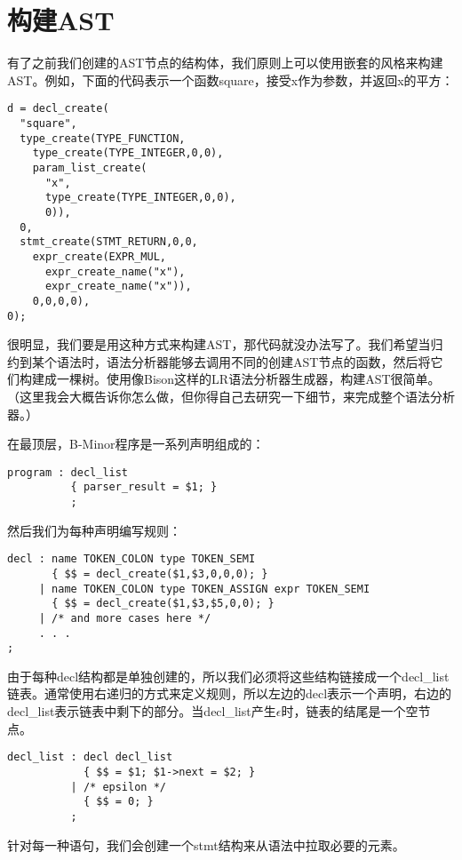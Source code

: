 \documentclass[cn,11pt,chinese]{elegantbook}
\begin{document}
\section{构建AST}

有了之前我们创建的AST节点的结构体，我们原则上可以使用嵌套的风格来构建AST。例如，下面的代码表示一个函数square，接受x作为参数，并返回x的平方：

\begin{verbatim}
d = decl_create(
  "square",
  type_create(TYPE_FUNCTION,
    type_create(TYPE_INTEGER,0,0),
    param_list_create(
      "x",
      type_create(TYPE_INTEGER,0,0),
      0)),
  0,
  stmt_create(STMT_RETURN,0,0,
    expr_create(EXPR_MUL,
      expr_create_name("x"),
      expr_create_name("x")),
    0,0,0,0),
0);
\end{verbatim}

很明显，我们要是用这种方式来构建AST，那代码就没办法写了。我们希望当归约到某个语法时，语法分析器能够去调用不同的创建AST节点的函数，然后将它们构建成一棵树。使用像Bison这样的LR语法分析器生成器，构建AST很简单。（这里我会大概告诉你怎么做，但你得自己去研究一下细节，来完成整个语法分析器。）

在最顶层，B-Minor程序是一系列声明组成的：

\begin{verbatim}
program : decl_list
          { parser_result = $1; }
          ;
\end{verbatim}

然后我们为每种声明编写规则：

\begin{verbatim}
decl : name TOKEN_COLON type TOKEN_SEMI
       { $$ = decl_create($1,$3,0,0,0); }
     | name TOKEN_COLON type TOKEN_ASSIGN expr TOKEN_SEMI
       { $$ = decl_create($1,$3,$5,0,0); }
     | /* and more cases here */
     . . .
;
\end{verbatim}

由于每种decl结构都是单独创建的，所以我们必须将这些结构链接成一个decl\_list链表。通常使用右递归的方式来定义规则，所以左边的decl表示一个声明，右边的decl\_list表示链表中剩下的部分。当decl\_list产生$\epsilon$时，链表的结尾是一个空节点。

\begin{verbatim}
decl_list : decl decl_list
            { $$ = $1; $1->next = $2; }
          | /* epsilon */
            { $$ = 0; }
          ;
\end{verbatim}

针对每一种语句，我们会创建一个stmt结构来从语法中拉取必要的元素。
\end{document}
